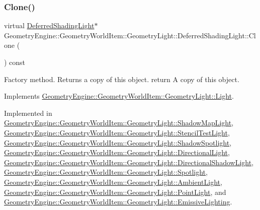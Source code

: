 \subsubsection{\texorpdfstring{Clone()}{Clone()}}
{\footnotesize\ttfamily virtual \mbox{\hyperlink{class_geometry_engine_1_1_geometry_world_item_1_1_geometry_light_1_1_deferred_shading_light}{Deferred\+Shading\+Light}}$\ast$ Geometry\+Engine\+::\+Geometry\+World\+Item\+::\+Geometry\+Light\+::\+Deferred\+Shading\+Light\+::\+Clone (\begin{DoxyParamCaption}{ }\end{DoxyParamCaption}) const\hspace{0.3cm}{\ttfamily [pure virtual]}}

Factory method. Returns a copy of this object. return A copy of this object. 

Implements \mbox{\hyperlink{class_geometry_engine_1_1_geometry_world_item_1_1_geometry_light_1_1_light_af367fa7201ad377a45fdc13e2002c518}{Geometry\+Engine\+::\+Geometry\+World\+Item\+::\+Geometry\+Light\+::\+Light}}.



Implemented in \mbox{\hyperlink{class_geometry_engine_1_1_geometry_world_item_1_1_geometry_light_1_1_shadow_map_light_a48eb6af2e6bb8487568ee4265fbc49ee}{Geometry\+Engine\+::\+Geometry\+World\+Item\+::\+Geometry\+Light\+::\+Shadow\+Map\+Light}}, \mbox{\hyperlink{class_geometry_engine_1_1_geometry_world_item_1_1_geometry_light_1_1_stencil_test_light_a6434a228dc64537ff9984c82eaf8ab07}{Geometry\+Engine\+::\+Geometry\+World\+Item\+::\+Geometry\+Light\+::\+Stencil\+Test\+Light}}, \mbox{\hyperlink{class_geometry_engine_1_1_geometry_world_item_1_1_geometry_light_1_1_shadow_spotlight_a0ea8fd05d26f6e780d352168c28f940d}{Geometry\+Engine\+::\+Geometry\+World\+Item\+::\+Geometry\+Light\+::\+Shadow\+Spotlight}}, \mbox{\hyperlink{class_geometry_engine_1_1_geometry_world_item_1_1_geometry_light_1_1_directional_light_a032fe23fba3bd8d0fd35f9d4ac6a9de0}{Geometry\+Engine\+::\+Geometry\+World\+Item\+::\+Geometry\+Light\+::\+Directional\+Light}}, \mbox{\hyperlink{class_geometry_engine_1_1_geometry_world_item_1_1_geometry_light_1_1_directional_shadow_light_ae5016cad41a62c4c870a942acc3f9afe}{Geometry\+Engine\+::\+Geometry\+World\+Item\+::\+Geometry\+Light\+::\+Directional\+Shadow\+Light}}, \mbox{\hyperlink{class_geometry_engine_1_1_geometry_world_item_1_1_geometry_light_1_1_spotlight_a7feb062f72b8110cf7d8d614d2daad92}{Geometry\+Engine\+::\+Geometry\+World\+Item\+::\+Geometry\+Light\+::\+Spotlight}}, \mbox{\hyperlink{class_geometry_engine_1_1_geometry_world_item_1_1_geometry_light_1_1_ambient_light_a890a2ff8ce5cde88cdc51b4e598ca9af}{Geometry\+Engine\+::\+Geometry\+World\+Item\+::\+Geometry\+Light\+::\+Ambient\+Light}}, \mbox{\hyperlink{class_geometry_engine_1_1_geometry_world_item_1_1_geometry_light_1_1_point_light_a68321b758cff76fa55f3cd5ef2824035}{Geometry\+Engine\+::\+Geometry\+World\+Item\+::\+Geometry\+Light\+::\+Point\+Light}}, and \mbox{\hyperlink{class_geometry_engine_1_1_geometry_world_item_1_1_geometry_light_1_1_emissive_lighting_ac7e3e90cadf700764fccdacc94238bac}{Geometry\+Engine\+::\+Geometry\+World\+Item\+::\+Geometry\+Light\+::\+Emissive\+Lighting}}.

